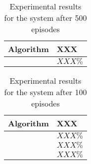 \label{section:tables_results}
\begin{table}[H]
	
	\begin{tabular}{
			|p{}|p{}|
		}
		\hline
		\textbf{Algorithm} & \textbf{XXX} \\
		\hline
		\algorithmBalanced{}{} & $XXX\%$  \\
		\hline
	\end{tabular}
\centering
\captionsetup{labelfont=bf,singlelinecheck=on,justification=raggedright}
\caption{Experimental results for the \simulationSimple{}{} system after 500 episodes}
\label{table:results_balanced}
\end{table}
\begin{table}[H]
	
	\begin{tabular}{
			|p{}|p{}|
		}
		\hline
		\textbf{Algorithm} & \textbf{XXX} \\
		\hline
		\algorithmEnergy{}{} & $XXX\%$ \\
		\algorithmQuality{}{} & $XXX\%$ \\
		\algorithmDistribution{}{} &  $XXX\%$ \\
		\hline
	\end{tabular}
	\centering
	\captionsetup{labelfont=bf,singlelinecheck=on,justification=raggedright}
	\caption{Experimental results for the \simulationExtended{}{} system after 100 episodes}
	\label{table:results_unbalanced}
\end{table}